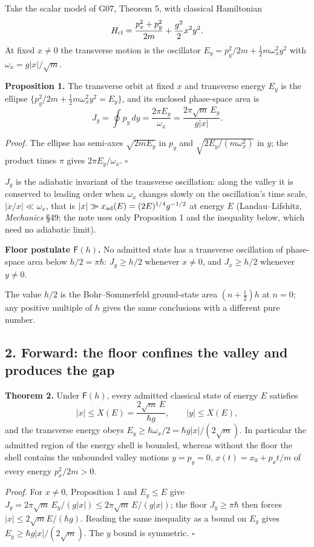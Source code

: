 \documentclass[11pt,a4paper]{article}
\begin{document}
Take the scalar model of G07, Theorem 5, with classical Hamiltonian
\[H_{\rm cl}=\frac{p_x^2+p_y^2}{2m}+\frac{g^2}{2}x^2y^2 .\] At fixed
\(x\neq0\) the transverse motion is the oscillator
\(E_y=p_y^2/2m+\tfrac12m\omega_x^2y^2\) with \(\omega_x=g|x|/\sqrt m\).

\textbf{Proposition 1.} The transverse orbit at fixed \(x\) and
transverse energy \(E_y\) is the ellipse
\(\{p_y^2/2m+\tfrac12m\omega_x^2y^2=E_y\}\), and its enclosed
phase-space area is
\[J_y=\oint p_y\,dy=\frac{2\pi E_y}{\omega_x}=\frac{2\pi\sqrt m\,E_y}{g|x|}.\]

\emph{Proof.} The ellipse has semi-axes \(\sqrt{2mE_y}\) in \(p_y\) and
\(\sqrt{2E_y/(m\omega_x^2)}\) in \(y\); the product times \(\pi\) gives
\(2\pi E_y/\omega_x\). \(\square\)

\(J_y\) is the adiabatic invariant of the transverse oscillation: along
the valley it is conserved to leading order when \(\omega_x\) changes
slowly on the oscillation's time scale, \(|\dot x/x|\ll\omega_x\), that
is \(|x|\gg x_{\rm ad}(E)=(2E)^{1/4}g^{-1/2}\) at energy \(E\)
(Landau--Lifshitz, \emph{Mechanics} §49; the note uses only Proposition
1 and the inequality below, which need no adiabatic limit).

\textbf{Floor postulate \(\mathsf F(h)\).} No admitted state has a
transverse oscillation of phase-space area below \(h/2=\pi\hbar\):
\(J_y\ge h/2\) whenever \(x\ne0\), and \(J_x\ge h/2\) whenever
\(y\ne0\).

The value \(h/2\) is the Bohr--Sommerfeld ground-state area
\((n+\tfrac12)h\) at \(n=0\); any positive multiple of \(h\) gives the
same conclusions with a different pure number.

\subsection{2. Forward: the floor confines the valley and produces the
gap}\label{forward-the-floor-confines-the-valley-and-produces-the-gap}

\textbf{Theorem 2.} Under \(\mathsf F(h)\), every admitted classical
state of energy \(E\) satisfies
\[|x|\le X(E)=\frac{2\sqrt m\,E}{\hbar g},\qquad |y|\le X(E),\] and the
transverse energy obeys \(E_y\ge\hbar\omega_x/2=\hbar g|x|/(2\sqrt m)\).
In particular the admitted region of the energy shell is bounded,
whereas without the floor the shell contains the unbounded valley
motions \(y=p_y=0\), \(x(t)=x_0+p_xt/m\) of every energy \(p_x^2/2m>0\).

\emph{Proof.} For \(x\ne0\), Proposition 1 and \(E_y\le E\) give
\(J_y=2\pi\sqrt m\,E_y/(g|x|)\le2\pi\sqrt m\,E/(g|x|)\); the floor
\(J_y\ge\pi\hbar\) then forces \(|x|\le2\sqrt mE/(\hbar g)\). Reading
the same inequality as a bound on \(E_y\) gives
\(E_y\ge\hbar g|x|/(2\sqrt m)\). The \(y\) bound is symmetric.
\(\square\)
\end{document}
